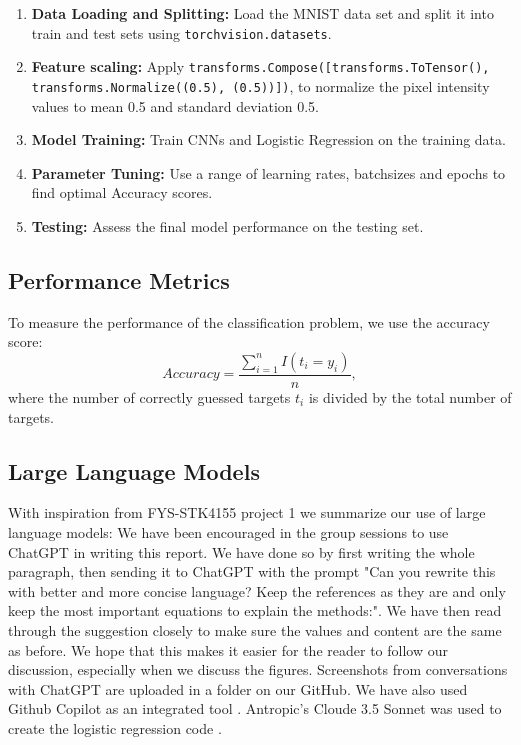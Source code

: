 \begin{enumerate}
    \item \textbf{Data Loading and Splitting:} Load the MNIST data set and split it into train and test sets using \texttt{torchvision.datasets}. 
    \item \textbf{Feature scaling:} Apply \texttt{transforms.Compose([transforms.ToTensor(),
    transforms.Normalize((0.5), (0.5))])}, to normalize the pixel intensity values to mean 0.5 and standard deviation 0.5. 
    \item \textbf{Model Training:} Train CNNs and Logistic Regression on the training data.
    \item \textbf{Parameter Tuning:} Use a range of learning rates, batchsizes and epochs to find optimal Accuracy scores. 
    \item \textbf{Testing:} Assess the final model performance on the testing set.
\end{enumerate}


\subsection{Performance Metrics}

To measure the performance of the classification problem, we use the accuracy score: \begin{equation}
    Accuracy = \frac{\sum_{i=1}^n I(t_i = y_i)}{n},
\end{equation}
where the number of correctly guessed targets $t_i$ is divided by the total number of targets.


\subsection{Large Language Models}

With inspiration from FYS-STK4155 project 1 \cite{bore2023fysstk4155project1} we summarize our use of large language models: 
We have been encouraged in the group sessions to use ChatGPT \cite{openai2023chatgpt} in writing this report. We have done so by first writing the whole paragraph, then sending it to ChatGPT with the prompt "Can you rewrite this with better and more concise language? Keep the references as they are and only keep the most important equations to explain the methods:". We have then read through the suggestion closely to make sure the values and content are the same as before. We hope that this makes it easier for the reader to follow our discussion, especially when we discuss the figures. Screenshots from conversations with ChatGPT are uploaded in a folder on our GitHub. We
have also used Github Copilot as an integrated tool \cite{github_copilot}. Antropic's Cloude 3.5 Sonnet was used to create the logistic regression code \cite{anthropic_claude_3_5_sonnet}. 


